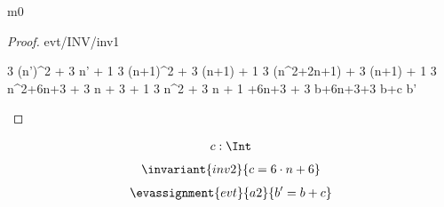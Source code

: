 \documentclass[12pt]{amsart}
\begin{document}
\begin{machine}{m0}
%
\begin{proof}{evt/INV/inv1}
	\begin{calculation}
		3 \cdot (n')^2 + 3 \cdot n' + 1
	\hint{=}{ \ref{a0} }
		3 \cdot (n+1)^2 + 3 \cdot (n+1) + 1
		3 \cdot (n^2+2\cdot n+1) + 3 \cdot (n+1) + 1
		3 \cdot n^2+6\cdot n+3 + 3 \cdot n + 3 + 1
		3 \cdot n^2 + 3 \cdot n + 1 +6\cdot n+3 + 3
	\hint{=}{ \ref{inv1} }
		b+6\cdot n+3+3
		b+c
		b'
	\end{calculation}
\end{proof}
%
\begin{align*}
\variable{	c : \Int}
\end{align*}
%
\begin{align*}
\invariant{inv2}
{	c = 6 \cdot n + 6	}
\end{align*} 
%
\begin{align*}
\evassignment{evt}{a2}
{	b' = b + c	}
\end{align*}


\end{machine}
\end{document}
